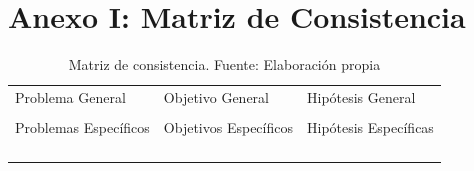 \chapter{Anexo I: Matriz de Consistencia}


\begin{table}[h!]
	\centering
	\small
	\begin{tabular}{ |m{5cm}|m{5cm}|m{5cm}|  }
		\hline
		\rowcolor{bluejean}
		\Centering \color{white}{PROBLEMAS}& \Centering \color{white}{OBJETIVOS}& \Centering \color{white}{HIPÓTESIS}\\
		\hline
		\rowcolor{turq}
		\Centering Problema General& \Centering Objetivo General & \Centering Hipótesis General \\
		\hline
		{\ProblemaGeneral} & { \ObjetivoGeneral} & {\HipotesisGeneral} \\
		\hline
		\rowcolor{turq}
		\Centering Problemas Específicos& \Centering Objetivos Específicos & \Centering Hipótesis Específicas \\
		\hline
		{\Pbone} & {\Objone} & {\Hone} \\
		\hline
		{\Pbtwo} & {\Objtwo} & {\Htwo} \\
		\hline
		{\Pbthree} & {\Objthree} & {\Hthree} \\
		\hline
		{\Pbfour} & {\Objfour} & {\Hfour} \\
		\hline

	\end{tabular}
	\caption{Matriz de consistencia. Fuente: Elaboración propia}
	\label{1:table}
\end{table}

